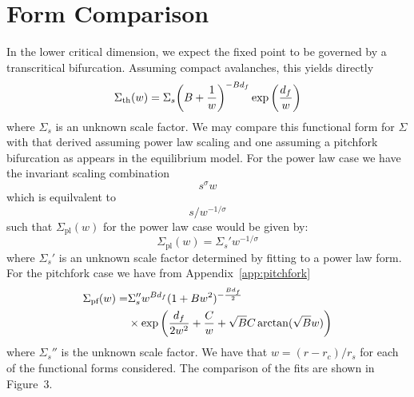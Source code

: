 \documentclass[reprint,amsmath,amssymb,aps,floatfix]{revtex4-1}
\begin{document}
\section{\label{app:compare} Form Comparison}
In the lower critical dimension, we expect the fixed point to be governed by a transcritical bifurcation. Assuming compact avalanches, this yields directly
%
\begin{equation}
	\Sigma_{\textrm{th}}(w) = \Sigma_s\bigg{(}B+\frac{1}{w}\bigg{)}^{-B d_f}\exp \bigg{(}\frac{d_f}{w}\bigg{)}
\end{equation}
%
\noindent where $\Sigma_s$ is an unknown scale factor. We may compare this functional form for $\Sigma$ with that derived assuming power law scaling and one assuming a pitchfork bifurcation as appears in the equilibrium model. For the power law case we have the invariant scaling combination
%
\begin{equation}
	s^\sigma w
\end{equation}
%
\noindent which is equilvalent to 
%
\begin{equation}
	s/w^{-1/\sigma}
\end{equation}
%
\noindent such that $\Sigma_{\textrm{pl}}(w)$ for the power law case would be given by:
%
\begin{equation}
	\Sigma_{\textrm{pl}}(w)=\Sigma_s'w^{-1/\sigma}
\end{equation}
%
\noindent where $\Sigma_s'$ is an unknown scale factor determined by fitting to a power law form. For the pitchfork case we have from Appendix~\ref{app:pitchfork}
%
\begin{equation}
	\begin{split}
		\Sigma_{\textrm{pf}}(w) = &\Sigma_s'' w^{B d_f}(1+B w^2)^{-\frac{B d_f}{2}} \\ 
		&\times\exp \bigg{(}\frac{d_f}{2w^2}+\frac{C}{w}+\sqrt{B} C \arctan(\sqrt{B}w)\bigg{)}
	\end{split}
\end{equation}
%
\noindent where $\Sigma_s''$ is the unknown scale factor. We have that $w=(r-r_c)/r_s$ for each of the functional forms considered. The comparison of the fits are shown in Figure~3. 
\end{document}
